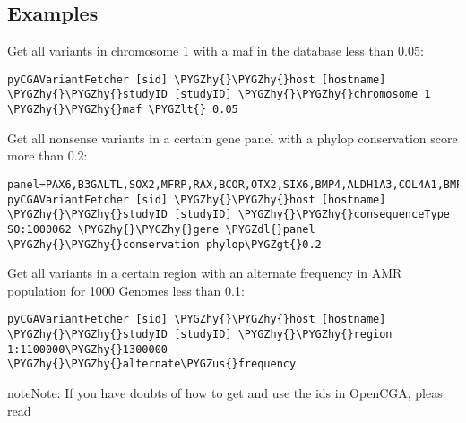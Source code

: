 \documentclass[letterpaper,10pt,english]{sphinxmanual}
\def\PYGZus{\char`\_}
\def\PYGZlt{\char`\<}
\def\PYGZgt{\char`\>}
\def\PYGZdl{\char`\$}
\def\PYGZhy{\char`\-}
\begin{document}
\subsection{Examples}
\label{pyVariantFetcher:examples}
Get all variants in chromosome 1 with a maf in the database less than 0.05:

\begin{Verbatim}[commandchars=\\\{\}]
pyCGAVariantFetcher [sid] \PYGZhy{}\PYGZhy{}host [hostname] \PYGZhy{}\PYGZhy{}studyID [studyID] \PYGZhy{}\PYGZhy{}chromosome 1 \PYGZhy{}\PYGZhy{}maf \PYGZlt{} 0.05
\end{Verbatim}

Get all nonsense variants in a certain gene panel with a phylop conservation score more than 0.2:

\begin{Verbatim}[commandchars=\\\{\}]
panel=PAX6,B3GALTL,SOX2,MFRP,RAX,BCOR,OTX2,SIX6,BMP4,ALDH1A3,COL4A1,BMPR1A,HCCS,CYP1B1,RAB3GAP1,SHH,VSX2,FOXC1,VAX1,FOXE3,FRAS1,FREM1,XPA,HDAC6,STRA6,FREM2,ERCC3,SMOC1,GRIP1,XPC,RAB18,ERCC2,DDB1,RAB3GAP2,DDB2,ABCB6,ERCC6,ERCC4,ERCC5,PITX2,POLH,GDF3,PITX3,ERCC8,GTF2H5,GDF6,ERCC1,MPLKIP,PRSS56,RARB,TENM3,MAB21L2,TBC1D20
pyCGAVariantFetcher [sid] \PYGZhy{}\PYGZhy{}host [hostname] \PYGZhy{}\PYGZhy{}studyID [studyID] \PYGZhy{}\PYGZhy{}consequenceType SO:1000062 \PYGZhy{}\PYGZhy{}gene \PYGZdl{}panel \PYGZhy{}\PYGZhy{}conservation phylop\PYGZgt{}0.2
\end{Verbatim}

Get all variants in a certain region with an alternate frequency in AMR population for 1000 Genomes less than 0.1:

\begin{Verbatim}[commandchars=\\\{\}]
pyCGAVariantFetcher [sid] \PYGZhy{}\PYGZhy{}host [hostname] \PYGZhy{}\PYGZhy{}studyID [studyID] \PYGZhy{}\PYGZhy{}region 1:1100000\PYGZhy{}1300000 \PYGZhy{}\PYGZhy{}alternate\PYGZus{}frequency
\end{Verbatim}

\begin{notice}{note}{Note:}
If you have doubts of how to get and use the ids in OpenCGA, pleas read {\hyperref[ids:how-to-use-ids]{\emph{}}}
\end{notice}
\end{document}
